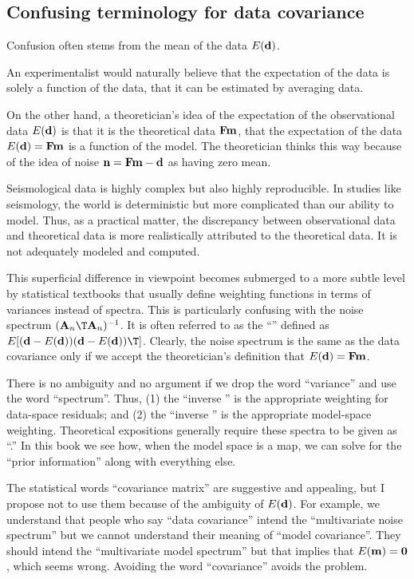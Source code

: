 \subsection{Confusing terminology for data covariance}
Confusion often stems from the mean of the data $E(\bold d)$.
\par
An experimentalist would naturally believe that
the expectation of the data
is solely a function of the data,
that it can be estimated by averaging data.
\par
On the other hand, a theoretician's idea
of the expectation of the observational data $E(\bold d)$
is that it is the theoretical data $\bold F\bold m$,
that the expectation of the data
$E(\bold d)=\bold F\bold m $ is a function of the model.
The theoretician thinks this way because of the idea
of noise $\bold n=\bold F\bold m-\bold d$ as having zero mean.
\par
Seismological data is highly complex but also highly reproducible.
In studies like seismology,
the world is deterministic but more complicated than our ability to model.
Thus, as a practical matter,
the discrepancy between observational data and theoretical data
is more realistically attributed to the theoretical data.
It is not adequately modeled and computed.
\par
This superficial difference in viewpoint becomes submerged
to a more subtle level
by statistical textbooks that usually define weighting functions
in terms of variances instead of spectra.
This is particularly confusing with the noise spectrum
$(\bold A_n\T \bold A_n)^{-1}$.
It is often referred to as the ``''
defined as $E[(\bold d-E(\bold d))(\bold d-E(\bold d))\T]$.
Clearly, the noise spectrum is the same as the data covariance
only if we accept the theoretician's definition
that $E(\bold d)=\bold F\bold m$.
\par
There is no ambiguity and no argument
if we drop the word ``variance'' and use the word ``spectrum''.
Thus,
(1) the ``inverse ''
is the appropriate weighting for data-space residuals;
and (2) the ``inverse ''
is the appropriate model-space weighting.
Theoretical expositions generally require
these spectra to be given as ``.''
In this book we see how,
when the model space is a map,
we can solve for the ``prior information''
along with everything else.

\par
The statistical words ``covariance matrix'' are suggestive and appealing,
but I propose not to use them
because of the ambiguity of $E(\bold d)$.
For example, we understand that people who say ``data covariance''
intend the ``multivariate noise spectrum''
but we cannot understand their meaning of ``model covariance''.
They should intend the ``multivariate model spectrum''
but that implies that $E(\bold m)=\bold 0$,
which seems wrong.
Avoiding the word ``covariance'' avoids the problem.

